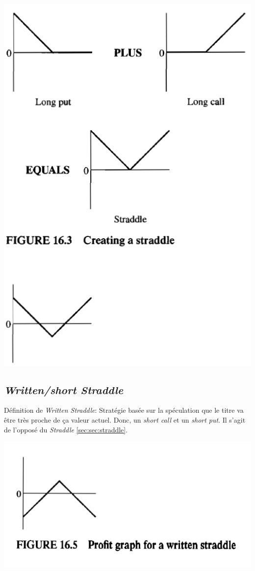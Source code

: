 \documentclass[11pt,french]{report}
\begin{document}
\includegraphics[scale=0.43]{picture26.PNG}

\subsection{\emph{Written/short Straddle}}
\label{sec:sec: written straddle}

Définition de \emph{Written Straddle}: Stratégie basée sur la spéculation que le titre va être très proche de ça valeur actuel. Donc, un \emph{short call} et un \emph{short put}. Il s'agit de l'opposé du \emph{Straddle} \ref{sec:sec:straddle}.

\includegraphics[scale=0.45]{picture27.PNG}
\end{document}
